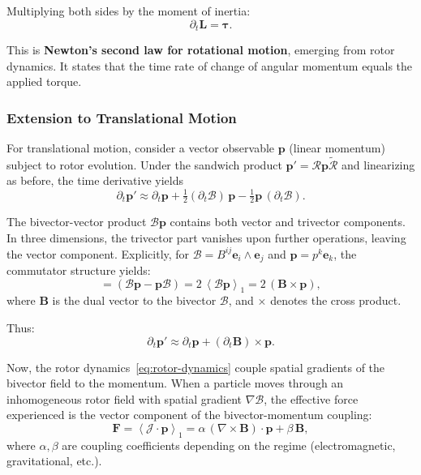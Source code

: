 \documentclass[11pt,a4paper]{article}
\newcommand{\e}{\mathbf{e}}
\newcommand{\grade}[2]{\left\langle #1 \right\rangle_{#2}}
\newcommand{\vecp}[1]{\grade{#1}{1}}
\newcommand{\rev}[1]{\widetilde{#1}}           %
\newcommand{\Rotor}{\mathcal{R}}
\newcommand{\Biv}{\mathcal{B}}
\theoremstyle{definition}
\theoremstyle{plain}
\theoremstyle{remark}
\begin{document}
Multiplying both sides by the moment of inertia:
\begin{equation}
\partial_t \bm{L} = \bm{\tau}.
\label{eq:newton-rotational}
\end{equation}

This is \textbf{Newton's second law for rotational motion}, emerging from rotor dynamics. It states that the time rate of change of angular momentum equals the applied torque.

\subsubsection{Extension to Translational Motion}

For translational motion, consider a vector observable $\mathbf{p}$ (linear momentum) subject to rotor evolution. Under the sandwich product $\mathbf{p}' = \Rotor \mathbf{p} \rev{\Rotor}$ and linearizing as before, the time derivative yields
\begin{equation}
\partial_t \mathbf{p}' \approx \partial_t \mathbf{p} + \tfrac{1}{2}(\partial_t\Biv)\, \mathbf{p} - \tfrac{1}{2}\mathbf{p}\,(\partial_t\Biv).
\end{equation}

The bivector-vector product $\Biv \mathbf{p}$ contains both vector and trivector components. In three dimensions, the trivector part vanishes upon further operations, leaving the vector component. Explicitly, for $\Biv = B^{ij}\e_i\wedge\e_j$ and $\mathbf{p} = p^k\e_k$, the commutator structure yields:
\begin{equation}
[\Biv, \mathbf{p}] = (\Biv\mathbf{p} - \mathbf{p}\Biv) = 2\,\vecp{\Biv \mathbf{p}} = 2\,(\mathbf{B} \times \mathbf{p}),
\end{equation}
where $\mathbf{B}$ is the dual vector to the bivector $\Biv$, and $\times$ denotes the cross product.

Thus:
\begin{equation}
\partial_t \mathbf{p}' \approx \partial_t \mathbf{p} + (\partial_t\mathbf{B}) \times \mathbf{p}.
\end{equation}

Now, the rotor dynamics~\eqref{eq:rotor-dynamics} couple spatial gradients of the bivector field to the momentum. When a particle moves through an inhomogeneous rotor field with spatial gradient $\nabla\Biv$, the effective force experienced is the vector component of the bivector-momentum coupling:
\begin{equation}
\mathbf{F} = \vecp{\mathcal{J} \cdot \mathbf{p}} = \alpha\,(\nabla \times \mathbf{B}) \cdot \mathbf{p} + \beta\,\mathbf{B},
\end{equation}
where $\alpha, \beta$ are coupling coefficients depending on the regime (electromagnetic, gravitational, etc.).
\end{document}
